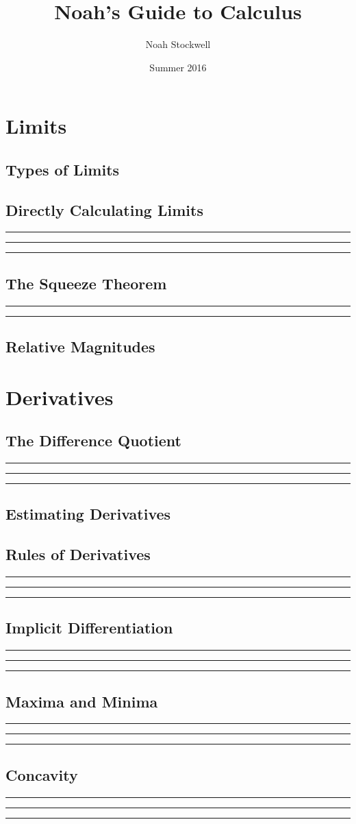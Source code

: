 \documentclass{article}
\title{Noah's Guide to Calculus}
\author{Noah Stockwell}
\date{Summer 2016}
\newcommand{\newMidline}{\noindent\rule[0.5ex]{\linewidth}{1pt}}
\newcommand{\newchapter}[2]
{
	\subsection{#1}\newMidline\newMidline\newMidline\vspace{.125in}
}
\begin{document}
\maketitle
\vspace{2in}
\begin{center}\end{center}
\newpage

\newpage

\newpage
\tableofcontents
\newpage
\section{Limits} 
\subsection{Types of Limits}  
\newchapter{Directly Calculating Limits}{DirectlyCalculatingLimits}
\subsection{The Squeeze Theorem}\newMidline\newMidline\vspace{.125in}
\subsection{Relative Magnitudes} \newpage
\section{Derivatives} 
\newchapter{The Difference Quotient}{DifferenceQuotient}
\subsection{Estimating Derivatives}
\newchapter{Rules of Derivatives}{DerivativeRules}
\newchapter{Implicit Differentiation}{ImplicitDifferentiation}
\newchapter{Maxima and Minima}{MaxAndMin}
\newchapter{Concavity}{Concavity}
\end{document}
